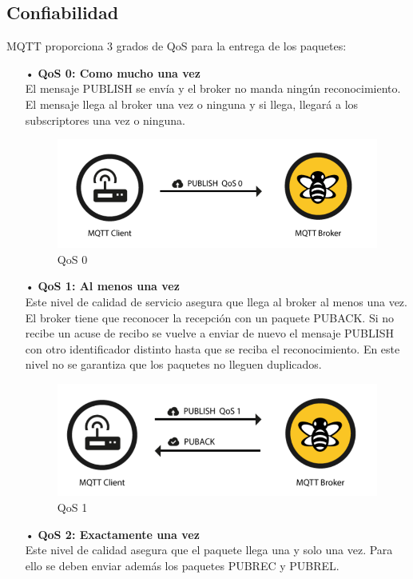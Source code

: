 \documentclass[12pt, twoside]{book}
\begin{document}
\subsection{Confiabilidad}
MQTT proporciona 3 grados de QoS para la entrega de los paquetes:
\begin{itemize}
\item[•]\textbf{QoS 0: Como mucho una vez}\\
El mensaje PUBLISH se envía y el broker no manda ningún reconocimiento. El mensaje llega al broker una vez o ninguna y si llega, llegará a los subscriptores una vez o ninguna.
\begin{figure}[h!]
\centering
\includegraphics[scale=0.3]{images/qos0}
\caption{QoS 0}\label{L406}
\end{figure}
\item[•]\textbf{QoS 1: Al menos una vez}\\
Este nivel de calidad de servicio asegura que llega al broker al menos una vez. El broker tiene que reconocer la recepción con un paquete PUBACK. Si no recibe un acuse de recibo se vuelve a enviar de nuevo el mensaje PUBLISH con otro identificador distinto hasta que se reciba el reconocimiento. En este nivel no se garantiza que los paquetes no lleguen duplicados.
\begin{figure}[H]
\centering
\includegraphics[scale=0.3]{images/qos1}
\caption{QoS 1}\label{L407}
\end{figure}
\item[•] \textbf{QoS 2: Exactamente una vez}\\
Este nivel de calidad asegura que el paquete llega una y solo una vez. Para ello se deben enviar además los paquetes PUBREC y PUBREL.

\end{itemize}
\end{document}
